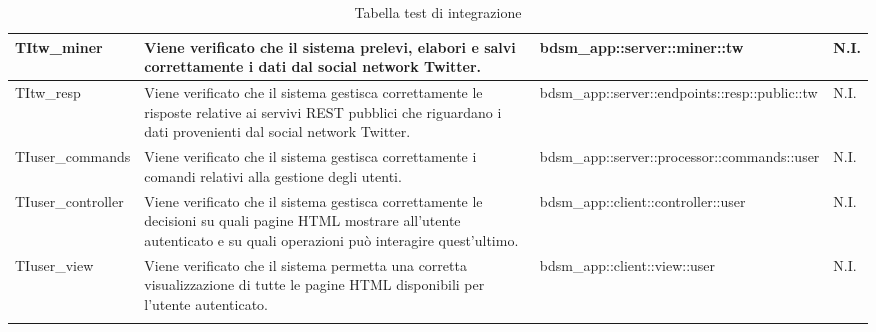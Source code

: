 \begin{center}
\begin{longtable}{| p{3.8cm} | p{4.5cm} | p{3.2cm} | p{1cm} |}
					\hline
					TItw\_miner & Viene verificato che il sistema prelevi, elabori e salvi correttamente i dati dal social network Twitter. & bdsm\_app::\-server::\-miner::\-tw & N.I.\\
					\hline
					TItw\_resp & Viene verificato che il sistema gestisca correttamente le risposte relative ai servivi REST pubblici che riguardano i dati provenienti dal social network Twitter. & bdsm\_app::\-server::\-endpoints::\-resp::\-public::\-tw & N.I.\\
					\hline
					TIuser\_commands & Viene verificato che il sistema gestisca correttamente i comandi relativi alla gestione degli utenti.  & bdsm\_app::\-server::\-processor::\-commands::\-user & N.I.\\
					\hline
					TIuser\_controller & Viene verificato che il sistema gestisca correttamente le decisioni su quali pagine HTML mostrare all'utente autenticato e su quali operazioni può interagire quest'ultimo. & bdsm\_app::\-client::\-controller::\-user & N.I.\\
					\hline
					TIuser\_view & Viene verificato che il sistema permetta una corretta visualizzazione di tutte le pagine HTML disponibili per l'utente autenticato. & bdsm\_app::\-client::\-view::\-user & N.I.\\
					\hline
			\caption{Tabella test di integrazione}
			\end{longtable}
				\egroup
\end{center}


